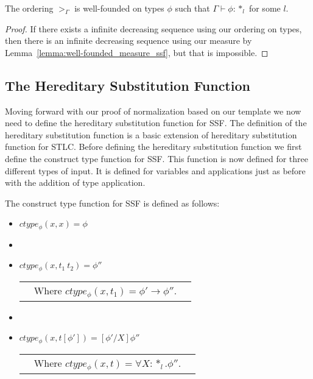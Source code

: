 \begin{thm}
  The ordering $>_\Gamma$ is well-founded on types $\phi$ such that 
  $\Gamma \vdash \phi:*_l$ for some $l$.
  \label{thm:well-founded_ordering_ssf}
\end{thm}
\begin{proof}
  If there exists a infinite decreasing sequence using our ordering on types,
  then there is an infinite decreasing sequence using our measure by 
  Lemma~\ref{lemma:well-founded_measure_ssf}, but that is impossible.
\end{proof}

\subsection{The Hereditary Substitution Function}
\label{subsec:the_hereditary_substitution_function}
Moving forward with our proof of normalization based on our template
we now need to define the hereditary substitution function for SSF.
The definition of the hereditary substitution function is a basic
extension of hereditary substitution function for STLC.  Before
defining the hereditary substitution function we first define the
construct type function for SSF.  This function is now defined for
three different types of input.  It is defined for variables and
applications just as before with the addition of type application.
\begin{definition}
  \label{def:ctype_function_ssf}
  The construct type function for SSF is defined as follows:
  \begin{itemize}
  \item[] $ctype_\phi(x,x) = \phi$
  \item[]
  \item[] $ctype_\phi(x,t_1\ t_2) = \phi''$\\
    \begin{tabular}{lll}
      & Where $ctype_\phi(x,t_1) = \phi' \to \phi''$.
    \end{tabular}    
  \item[]
  \item[] $ctype_\phi(x,t[\phi']) = [\phi'/X]\phi''$\\
    \begin{tabular}{lll}
      & Where $ctype_\phi(x,t) = \forall X:*_l.\phi''$.
    \end{tabular}    
  \end{itemize}
\end{definition}

